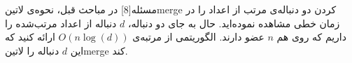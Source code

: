 
‌مسئله[8]
در مباحث قبل، نحوه‌ی 
‌لاتین{merge}
کردن دو دنباله‌ی مرتب از اعداد را در زمان خطی مشاهده ‌نموده‌اید. 
حال به جای دو دنباله،
$d$
دنباله از اعداد مرتب‌شده را داریم که روی هم
$n$
عضو دارند. الگوریتمی از مرتبه‌ی 
$O(n\log(d))$
ارائه کنید که این
$d$
دنباله را 
‌لاتین{merge}
کند.












